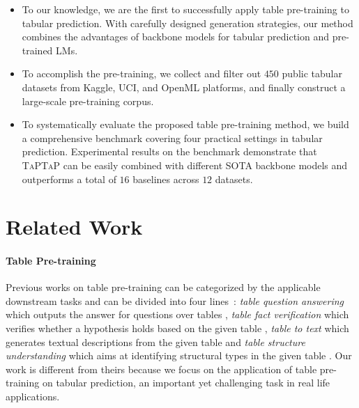 \begin{itemize}

\item To our knowledge, we are the first to successfully apply table pre-training to tabular prediction. With carefully designed generation strategies, our method combines the advantages of backbone models for tabular prediction and pre-trained LMs.

\item To accomplish the pre-training, we collect and filter out $450$ public tabular datasets from Kaggle, UCI, and OpenML platforms, and finally construct a large-scale pre-training corpus.

\item To systematically evaluate the proposed table pre-training method, we build a comprehensive benchmark covering four practical settings in tabular prediction. Experimental results on the benchmark demonstrate that \textsc{TaPTaP} can be easily combined with different SOTA backbone models and outperforms a total of $16$ baselines across $12$ datasets.

\end{itemize}

\section{Related Work}

\paragraph{Table Pre-training}

Previous works on table pre-training can be categorized by the applicable downstream tasks and can be divided into four lines~\citep{table_survey}: \textit{table question answering} which outputs the answer for questions over tables \citep{yin-etal-2020-tabert,herzig-etal-2020-tapas,Yu2020GraPPaGP,liu2022tapex,tabt5}, \textit{table fact verification} which verifies whether a hypothesis holds based on the given table \citep{eisenschlos-etal-2020-understanding}, \textit{table to text} which generates textual descriptions from the given table \citep{gong-etal-2020-tablegpt,xing-wan-2021-structure} and \textit{table structure understanding} which aims at identifying structural types in the given table \citep{rpt,tuta,deng-etal-2021-structure}. Our work is different from theirs because we focus on the application of table pre-training on tabular prediction, an important yet challenging task in real life applications.

